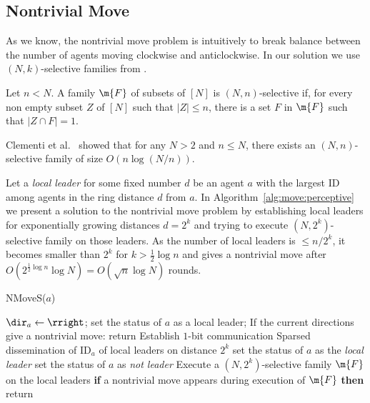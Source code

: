 \subsection{Nontrivial Move}
As we know, the nontrivial move problem is intuitively to break balance between the number
of agents moving clockwise and anticlockwise.
In our solution we use $(N,k)$-selective families from \cite{ClementiMS03}.
\begin{definition}
Let $n<N$. A family $\m{F}$ of subsets of $[N]$ is 
$(N, n)$-selective if, for every non empty subset $Z$ of $[N]$ such that $|Z|\leq n$, there is a
set $F$ in $\m{F}$ such that $|Z \cap F|=1$.
\end{definition}
Clementi et al.\ \cite{ClementiMS03} showed that 
for any $N>2$ and $n\leq N$, there exists an $(N,n)$-selective family of size
$O(n \log(N/n))$.

Let a {\em local leader} for some fixed number $d$ be an agent $a$ with the largest ID among agents
in the ring distance $d$ from $a$.
In Algorithm~\ref{alg:move:perceptive} we present a solution to the nontrivial move
problem by establishing local leaders for exponentially growing distances $d=2^k$ and trying
to execute $(N,2^k)$-selective family on those leaders. As the number of local leaders is
$\leq n/2^k$, it becomes smaller than $2^k$ for $k>\frac12\log n$ and gives a nontrivial
move after $O(2^{\frac12\log n}\log N)=O(\sqrt{n}\log N)$ rounds.

\begin{algorithm}[]
	\caption{NMoveS($a$)}
	\label{alg:move:perceptive}
	\begin{algorithmic}[1]
    \State $\dir_a\gets \rright$; set the status of $a$ as a local leader;
		\State \SingleRound
    \State If the current directions give a nontrivial move: return
\State Establish $1$-bit communication
        \State Sparsed dissemination of ID$_a$ of local leaders on distance $2^k$
            \State set the status of $a$ as the {\em local leader}
\Else
            \State set the status of $a$ as {\em not leader}
\EndIf
\State Execute a $(N,2^k)$-selective family $\m{F}$ on the local leaders
        \State \textbf{if} a nontrivial move appears during execution of $\m{F}$ \textbf{then} return
    \EndFor
\end{algorithmic}
\end{algorithm}



